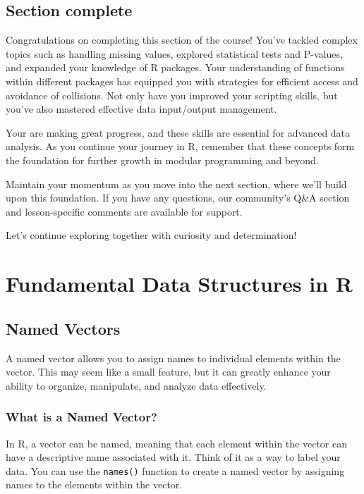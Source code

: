 \documentclass[
]{book}
\begin{document}
\hypertarget{section-complete-1}{%
\section{Section complete}\label{section-complete-1}}

Congratulations on completing this section of the course! You've tackled complex topics such as handling missing values, explored statistical tests and P-values, and expanded your knowledge of R packages. Your understanding of functions within different packages has equipped you with strategies for efficient access and avoidance of collisions. Not only have you improved your scripting skills, but you've also mastered effective data input/output management.

Your are making great progress, and these skills are essential for advanced data analysis. As you continue your journey in R, remember that these concepts form the foundation for further growth in modular programming and beyond.

Maintain your momentum as you move into the next section, where we'll build upon this foundation. If you have any questions, our community's Q\&A section and lesson-specific comments are available for support.

Let's continue exploring together with curiosity and determination!

\hypertarget{fundamental-data-structures-in-r}{%
\chapter{Fundamental Data Structures in R}\label{fundamental-data-structures-in-r}}

\hypertarget{named-vectors}{%
\section{Named Vectors}\label{named-vectors}}

A named vector allows you to assign names to individual elements within the vector. This may seem like a small feature, but it can greatly enhance your ability to organize, manipulate, and analyze data effectively.

\hypertarget{what-is-a-named-vector}{%
\subsection{What is a Named Vector?}\label{what-is-a-named-vector}}

In R, a vector can be named, meaning that each element within the vector can have a descriptive name associated with it. Think of it as a way to label your data. You can use the \texttt{names()} function to create a named vector by assigning names to the elements within the vector.
\end{document}
